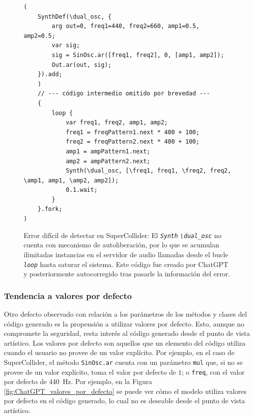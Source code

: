 \begin{figure}[H]
    \caption[Error difícil de detectar en SuperCollider]{Error difícil de detectar en SuperCollider: El \emph{\texttt{Synth}} \emph{\texttt{\textbackslash dual\_osc}} no cuenta con mecanismo de autoliberación, por lo que se acumulan ilimitadas instancias en el servidor de audio llamadas desde el bucle \emph{\texttt{loop}} hasta saturar el sistema. Este código fue creado por ChatGPT y posteriormente autocorregido tras pasarle la información del error.}
    \centering
    \begin{lstlisting}[style=SuperCollider-IDE, basicstyle=\footnotesize\ttfamily, numbers=none]
(
    SynthDef(\dual_osc, {
        arg out=0, freq1=440, freq2=660, amp1=0.5, amp2=0.5;
        var sig;
        sig = SinOsc.ar([freq1, freq2], 0, [amp1, amp2]);
        Out.ar(out, sig);
    }).add;
    )
    // --- código intermedio omitido por brevedad ---
    {
        loop {
            var freq1, freq2, amp1, amp2;
            freq1 = freqPattern1.next * 400 + 100;
            freq2 = freqPattern2.next * 400 + 100;
            amp1 = ampPattern1.next;
            amp2 = ampPattern2.next;
            Synth(\dual_osc, [\freq1, freq1, \freq2, freq2, \amp1, amp1, \amp2, amp2]);
            0.1.wait;
        }
    }.fork;
)
    \end{lstlisting}
    \source{\propio}
    \label{fig:error_dificil_detectar_supercollider}
\end{figure}

\subsubsection{Tendencia a valores {por defecto}}
Otro defecto observado con relación a los parámetros de los métodos y clases del código generado es la propensión a utilizar valores por defecto. Esto, aunque no compromete la seguridad, resta interés al código generado desde el punto de vista artístico. Los valores por defecto son aquellos que un elemento del código utiliza cuando el usuario no provee de un valor explícito. Por ejemplo, en el caso de SuperCollider, el método \texttt{SinOsc.ar} cuenta con un parámetro \texttt{mul} que, si no se provee de un valor explícito, toma el valor por defecto de $1$; o \texttt{freq}, con el valor por defecto de \SI{440}{\hertz}. Por ejemplo, en la Figura \ref{fig:ChatGPT_valores_por_defecto} se puede ver cómo el modelo utiliza valores por defecto en el código generado, lo cual no es deseable desde el punto de vista artístico.

